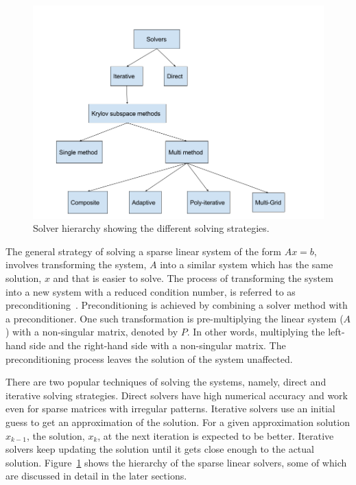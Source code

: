 \begin{figure}
\begin{center}
 \includegraphics[width=0.95\linewidth]{figures/solver.png}
\end{center}
 \caption{Solver hierarchy showing the different solving strategies.}
 \label{fig:solver}
\end{figure}

The general strategy of solving a sparse linear system of the form $Ax = b$, 
involves transforming the system, $A$ into a similar system which has the same solution, $x$ 
and that is easier to solve. The process of transforming the system into a new system with a reduced condition number, is referred to as preconditioning~\cite{misc3}. Preconditioning is achieved by combining a solver method with a preconditioner. One such transformation 
is pre-multiplying the linear system ($A$) with a non-singular matrix, denoted by $P$. In other words, multiplying 
the left-hand side and the right-hand side with a non-singular matrix. The preconditioning process leaves the solution of the system unaffected. 

There are two popular techniques of solving the systems, namely, direct and iterative solving strategies. Direct solvers have high numerical accuracy and work even for sparse matrices with irregular patterns. Iterative solvers use an initial guess to get an approximation of the solution. For a given approximation solution $x_{k-1}$, the solution, $x_{k}$, at the next iteration is expected to be better. Iterative solvers keep updating the solution until it gets close enough to the actual solution. Figure~\ref{fig:solver} shows the hierarchy of the sparse linear solvers, some of which are discussed in detail in the later sections.


